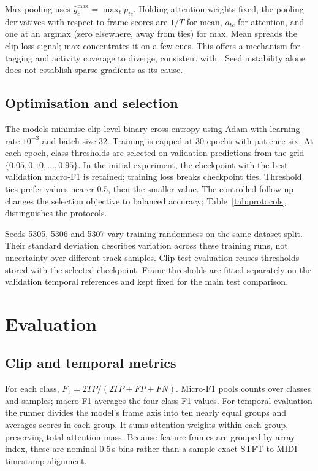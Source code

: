 \documentclass[10pt,a4paper]{article}
\begin{document}
Max pooling uses $\widehat y_c^{\max}=\max_t p_{tc}$. Holding attention weights fixed, the pooling derivatives with respect to frame scores are $1/T$ for mean, $a_{tc}$ for attention, and one at an argmax (zero elsewhere, away from ties) for max. Mean spreads the clip-loss signal; max concentrates it on a few cues. This offers a mechanism for tagging and activity coverage to diverge, consistent with \cite{milpooling}. Seed instability alone does not establish sparse gradients as its cause.

\subsection{Optimisation and selection}
The models minimise clip-level binary cross-entropy using Adam with learning rate $10^{-3}$ and batch size 32. Training is capped at 30 epochs with patience six. At each epoch, class thresholds are selected on validation predictions from the grid $\{0.05,0.10,\ldots,0.95\}$. In the initial experiment, the checkpoint with the best validation macro-F1 is retained; training loss breaks checkpoint ties. Threshold ties prefer values nearer 0.5, then the smaller value. The controlled follow-up changes the selection objective to balanced accuracy; Table~\ref{tab:protocols} distinguishes the protocols.

Seeds 5305, 5306 and 5307 vary training randomness on the same dataset split. Their standard deviation describes variation across these training runs, not uncertainty over different track samples. Clip test evaluation reuses thresholds stored with the selected checkpoint. Frame thresholds are fitted separately on the validation temporal references and kept fixed for the main test comparison.

\section{Evaluation}
\subsection{Clip and temporal metrics}
For each class, $F_1=2TP/(2TP+FP+FN)$. Micro-F1 pools counts over classes and samples; macro-F1 averages the four class F1 values. For temporal evaluation the runner divides the model's frame axis into ten nearly equal groups and averages scores in each group. It sums attention weights within each group, preserving total attention mass. Because feature frames are grouped by array index, these are nominal 0.5\,s bins rather than a sample-exact STFT-to-MIDI timestamp alignment.
\end{document}
